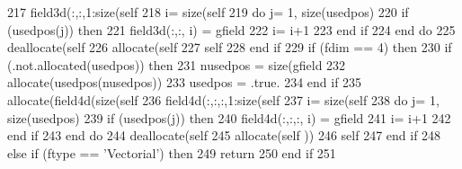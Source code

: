 \begin{DoxyCode}
217             field3d(:,:,1:\textcolor{keyword}{size}(self%
218             i= \textcolor{keyword}{size}(self%
219             \textcolor{keywordflow}{do} j= 1, \textcolor{keyword}{size}(usedpos)
220                 \textcolor{keywordflow}{if} (usedpos(j)) \textcolor{keywordflow}{then}
221                     field3d(:,:, i) = gfield%
222                     i= i+1
223 \textcolor{keywordflow}{                end if}
224 \textcolor{keywordflow}{            end do}
225             \textcolor{keyword}{deallocate}(self%
226             \textcolor{keyword}{allocate}(self%
227             self%
228 \textcolor{keywordflow}{        end if}
229         \textcolor{keywordflow}{if} (fdim == 4) \textcolor{keywordflow}{then}
230             \textcolor{keywordflow}{if} (.not.\textcolor{keyword}{allocated}(usedpos)) \textcolor{keywordflow}{then}
231                 nusedpos = \textcolor{keyword}{size}(gfield%
232                 \textcolor{keyword}{allocate}(usedpos(nusedpos))
233                 usedpos = .true.
234 \textcolor{keywordflow}{            end if}
235             \textcolor{keyword}{allocate}(field4d(\textcolor{keyword}{size}(self%
236             field4d(:,:,:,1:\textcolor{keyword}{size}(self%
237              i= \textcolor{keyword}{size}(self%
238             \textcolor{keywordflow}{do} j= 1, \textcolor{keyword}{size}(usedpos)
239                 \textcolor{keywordflow}{if} (usedpos(j)) \textcolor{keywordflow}{then}
240                     field4d(:,:,:, i) = gfield%
241                     i= i+1
242 \textcolor{keywordflow}{                end if}
243 \textcolor{keywordflow}{            end do}
244             \textcolor{keyword}{deallocate}(self%
245             \textcolor{keyword}{allocate}(self%
      ))
246             self%
247 \textcolor{keywordflow}{        end if}
248     \textcolor{keywordflow}{else} \textcolor{keywordflow}{if} (ftype == \textcolor{stringliteral}{'Vectorial'}) \textcolor{keywordflow}{then}
249         \textcolor{keywordflow}{return}
250 \textcolor{keywordflow}{    end if}
251 
\end{DoxyCode}
\mbox{\label{namespacefieldtypes__mod_a4ec7b627804dfcdf20e3374ecc1cf459}} 
